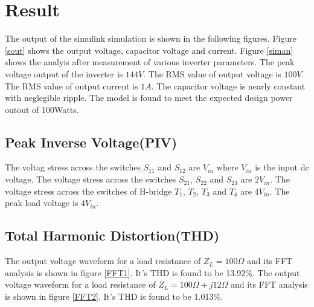 \documentclass[12pt,a4paper]{report}
\begin{document}
\section{Result}
The output of the simulink simulation is shown in the following figures. Figure \ref{sout} shows the output voltage, capacitor voltage and current. Figure \ref{siman} shows the analyis after measurement of various inverter parameters. The peak voltage output of the inverter is $144V$. The RMS value of output voltage is $100V$. The RMS value of output current is $1A$. The capacitor voltage is nearly constant with neglegible ripple. The model is found to meet the expected design power outout of 100Watts.\\
\subsection{Peak Inverse Voltage(PIV)}
The voltag stress across the switches $S_{11}$ and $S_{12}$ are $V_{in}$ where $V_{in}$ is the input dc voltage. The voltage stress across the switches $S_{21}$, $S_{22}$ and $S_{23}$ are $2V_{in}$. The voltage stress across the switches of H-bridge $T_1$, $T_2$, $T_3$ and $T_4$ are $4V_{in}$. The peak load voltage is $4V_{in}$.\\
\subsection{Total Harmonic Distortion(THD)}
The output voltage waveform for a load resistance of $Z_L = 100\Omega$ and its FFT analysis is shown in figure \ref{FFT1}. It's THD is found to be 13.92\%. The output voltage waveform for a load resistance of $Z_L = 100\Omega + j12\Omega$ and its FFT analysis is shown in figure \ref{FFT2}. It's THD is found to be 1.013\%.\\
\end{document}
